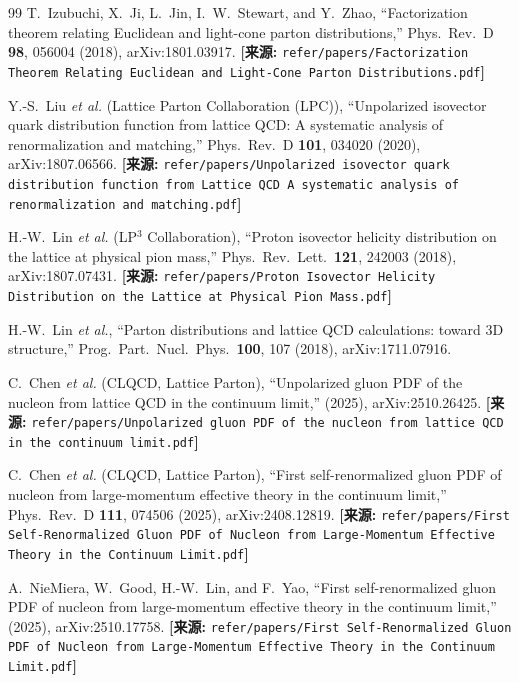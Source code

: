 \documentclass[12pt,a4paper]{ctexart}
\theoremstyle{definition}
\begin{document}
\begin{thebibliography}{99}
T.~Izubuchi, X.~Ji, L.~Jin, I.~W.~Stewart, and Y.~Zhao,
``Factorization theorem relating Euclidean and light-cone parton distributions,''
Phys.\ Rev.\ D \textbf{98}, 056004 (2018), arXiv:1801.03917.
\quad\textbf{[来源:} \texttt{refer/papers/Factorization Theorem Relating Euclidean and Light-Cone Parton Distributions.pdf}\textbf{]}

Y.-S.~Liu \textit{et al.} (Lattice Parton Collaboration (LPC)),
``Unpolarized isovector quark distribution function from lattice QCD: A systematic analysis of renormalization and matching,''
Phys.\ Rev.\ D \textbf{101}, 034020 (2020), arXiv:1807.06566.
\quad\textbf{[来源:} \texttt{refer/papers/Unpolarized isovector quark distribution function from Lattice QCD A systematic analysis of renormalization and matching.pdf}\textbf{]}

H.-W.~Lin \textit{et al.} (LP$^3$ Collaboration),
``Proton isovector helicity distribution on the lattice at physical pion mass,''
Phys.\ Rev.\ Lett.\ \textbf{121}, 242003 (2018), arXiv:1807.07431.
\quad\textbf{[来源:} \texttt{refer/papers/Proton Isovector Helicity Distribution on the Lattice at Physical Pion Mass.pdf}\textbf{]}

H.-W.~Lin \textit{et al.},
``Parton distributions and lattice QCD calculations: toward 3D structure,''
Prog.\ Part.\ Nucl.\ Phys.\ \textbf{100}, 107 (2018), arXiv:1711.07916.

C.~Chen \textit{et al.} (CLQCD, Lattice Parton),
``Unpolarized gluon PDF of the nucleon from lattice QCD in the continuum limit,''
(2025), arXiv:2510.26425.
\quad\textbf{[来源:} \texttt{refer/papers/Unpolarized gluon PDF of the nucleon from lattice QCD in the continuum limit.pdf}\textbf{]}

C.~Chen \textit{et al.} (CLQCD, Lattice Parton),
``First self-renormalized gluon PDF of nucleon from large-momentum effective theory in the continuum limit,''
Phys.\ Rev.\ D \textbf{111}, 074506 (2025), arXiv:2408.12819.
\quad\textbf{[来源:} \texttt{refer/papers/First Self-Renormalized Gluon PDF of Nucleon from Large-Momentum Effective Theory in the Continuum Limit.pdf}\textbf{]}

A.~NieMiera, W.~Good, H.-W.~Lin, and F.~Yao,
``First self-renormalized gluon PDF of nucleon from large-momentum effective theory in the continuum limit,''
(2025), arXiv:2510.17758.
\quad\textbf{[来源:} \texttt{refer/papers/First Self-Renormalized Gluon PDF of Nucleon from Large-Momentum Effective Theory in the Continuum Limit.pdf}\textbf{]}


\end{thebibliography}
\end{document}
